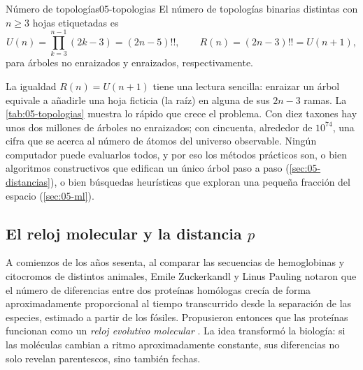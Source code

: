 \begin{teorema}{Número de topologías}{05-topologias}
El número de topologías binarias distintas con $n\ge 3$ hojas etiquetadas es
\begin{equation}\label{eq:05-topologias}
U(n) = \prod_{k=3}^{n-1}(2k-3) = (2n-5)!!,\qquad R(n) = (2n-3)!! = U(n+1),
\end{equation}
para árboles no enraizados y enraizados, respectivamente.
\end{teorema}

\begin{simbolos}
\end{simbolos}

La igualdad $R(n)=U(n+1)$ tiene una lectura sencilla: enraizar un árbol equivale a añadirle una hoja ficticia (la raíz) en alguna de sus $2n-3$ ramas. La \cref{tab:05-topologias} muestra lo rápido que crece el problema. Con diez taxones hay unos dos millones de árboles no enraizados; con cincuenta, alrededor de $10^{74}$, una cifra que se acerca al número de átomos del universo observable. Ningún computador puede evaluarlos todos, y por eso los métodos prácticos son, o bien algoritmos constructivos que edifican un único árbol paso a paso (\cref{sec:05-distancias}), o bien búsquedas heurísticas que exploran una pequeña fracción del espacio (\cref{sec:05-ml}).

\begin{table}[t]
\centering
\caption[Número de topologías]{Número de topologías binarias para $n$ taxones (\cref{eq:05-topologias}). Valores calculados de forma exacta en .}
\label{tab:05-topologias}
\small

\end{table}

\subsection{El reloj molecular y la distancia \texorpdfstring{$p$}{p}}

\begin{historia}
A comienzos de los años sesenta, al comparar las secuencias de hemoglobinas y citocromos de distintos animales, Emile Zuckerkandl y Linus Pauling notaron que el número de diferencias entre dos proteínas homólogas crecía de forma aproximadamente proporcional al tiempo transcurrido desde la separación de las especies, estimado a partir de los fósiles. Propusieron entonces que las proteínas funcionan como un \emph{reloj evolutivo molecular} \parencite{c05-zuckerkandl1965}. La idea transformó la biología: si las moléculas cambian a ritmo aproximadamente constante, sus diferencias no solo revelan parentescos, sino también fechas.
\end{historia}

